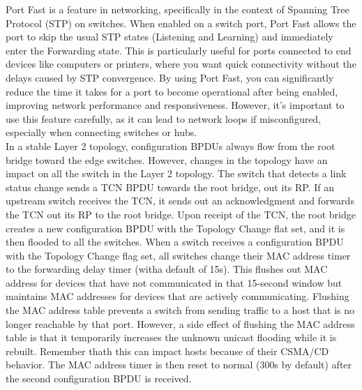 \documentclass{article}
\begin{document}
	Port Fast is a feature in networking, specifically in the context of Spanning Tree Protocol (STP) on switches. When enabled on a switch port, Port Fast allows the port to skip the usual STP states (Listening and Learning) and immediately enter the Forwarding state. This is particularly useful for ports connected to end devices like computers or printers, where you want quick connectivity without the delays caused by STP convergence. By using Port Fast, you can significantly reduce the time it takes for a port to become operational after being enabled, improving network performance and responsiveness. However, it’s important to use this feature carefully, as it can lead to network loops if misconfigured, especially when connecting switches or hubs.\\

	In a stable Layer 2 topology, configuration BPDUs always flow from the root bridge toward the edge switches. However, changes in the topology have an impact on all the switch in the Layer 2 topology. The switch that detects a link status change sends a TCN BPDU towards the root bridge, out its RP. If an upstream switch receives the TCN, it sends out an acknowledgment and forwards the TCN out its RP to the root bridge. Upon receipt of the TCN, the root bridge creates a new configuration BPDU with the Topology Change flat set, and it is then flooded to all the switches. When a switch receives a configuration BPDU with the Topology Change flag set, all switches change their MAC address timer to the forwarding delay timer (witha default of 15s). This flushes out MAC address for devices that have not communicated in that 15-second window but maintains MAC addresses for devices that are actively communicating. Flushing the MAC address table prevents a switch from sending traffic to a host that is no longer reachable by that port. However, a side effect of flushing the MAC address table is that it temporarily increases the unknown unicast flooding while it is rebuilt. Remember thath this can impact hosts because of their CSMA/CD behavior. The MAC address timer is then reset to normal (300s by default) after the second configuration BPDU is received.\\
\end{document}
